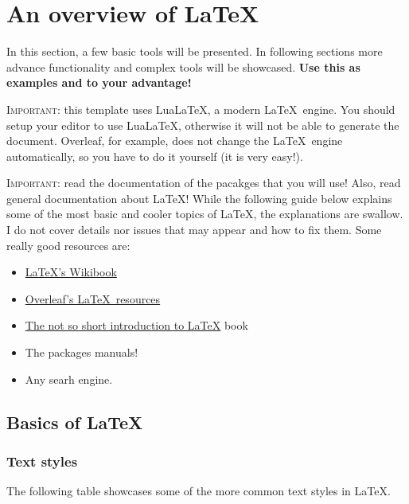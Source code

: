 \chapter{An overview of \LaTeX}

In this section, a few basic tools will be presented. In following sections more advance functionality and complex tools will be showcased. \textbf{Use this as examples and to your advantage!}

\textsc{\color{red}Important:} this template uses Lua\LaTeX, a modern \LaTeX\ engine. You should setup your editor to use Lua\LaTeX, otherwise it will not be able to generate the document. Overleaf, for example, does not change the \LaTeX\ engine automatically, so you have to do it yourself (it is very easy!).

\textsc{\color{red}Important:} read the documentation of the pacakges that you will use! Also, read general documentation about \LaTeX! While the following guide below explains some of the most basic and cooler topics of \LaTeX, the explanations are swallow. I do not cover details nor issues that may appear and how to fix them. Some really good resources are:
\begin{itemize}
	\item \href{https://en.wikibooks.org/wiki/LaTeX}{\LaTeX's Wikibook}
	\item \href{https://www.overleaf.com/learn}{Overleaf's \LaTeX\ resources}
	\item \href{https://www.ctan.org/tex-archive/info/lshort/english/}{The not so short introduction to \LaTeX} book
	\item {\color{red} The packages manuals!}
	\item Any searh engine.
\end{itemize}

\section{Basics of \LaTeX}

\subsection{Text styles}

The following table showcases some of the more common text styles in \LaTeX.


